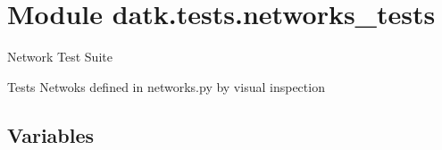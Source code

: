 %
%
%


\section{Module datk.tests.networks\_tests}

    \label{datk:tests:networks_tests}
Network Test Suite

Tests Netwoks defined in networks.py by visual inspection



  \subsection{Variables}

